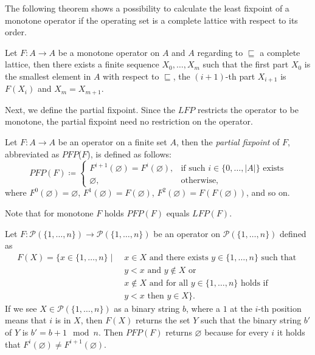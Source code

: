 The following theorem shows a possibility to calculate the least fixpoint of a monotone operator if the operating set is a complete lattice with respect to its order.

\begin{theorem}
\label{theorem:kleene}
Let $F: A \rightarrow A$ be a monotone operator on $A$ and $A$ regarding to $\sqsubseteq$ a complete lattice, then there exists a finite sequence $X_0, \dots, X_m$ such that the first part $X_0$ is the smallest element in $A$ with respect to $\sqsubseteq$, the $(i+1)$-th part $X_{i+1}$ is $F(X_i)$ and $X_m = X_{m+1}$.
\end{theorem}

Next, we define the partial fixpoint. Since the
$\mathit{LFP}$ restricts the operator to be monotone, the partial fixpoint need no restriction on the operator.

\begin{definition}
\label{definition:pfp}
    Let $F\colon A \rightarrow A$ be an operator on a finite set $A$, then the \emph{partial
    fixpoint} of $F$, abbreviated as $\mathit{PFP}$($F$), is defined as follows:
    \[\mathit{PFP}(F)\coloneqq\begin{cases}
               F^{i+1}(\varnothing)=F^i(\varnothing),  & \text{if such } i \in \{0,\dots,|A|\} \text{ exists}\\
               \varnothing, & \text{otherwise,}
    \end{cases}\]
    where $F^0(\varnothing) = \varnothing$, $F^1(\varnothing) = F(\varnothing)$, $F^2(\varnothing) = F(F(\varnothing))$, and so on.
\end{definition}

Note that for monotone $F$ holds $\mathit{PFP}(F)$ equals $\mathit{LFP}(F)$. 


\begin{example}
\label{example:pfp}
Let $F: \mathcal{P}(\{1, \dots, n\}) \rightarrow  \mathcal{P}(\{1, \dots, n\})$ be an operator on $ \mathcal{P}(\{1, \dots, n\})$ defined as
\begin{align*}
	F(X) = \{x \in \{1, \dots, n\}\mid &\; x\in X \text{ and there exists } y \in \{1, \dots, n\} \text{ such that }\\ &\;y < x \text{ and } y\not\in X \text{ or } \\&\;x\not\in X \text{ and for all } y\in \{1,\dots, n\} \text{ holds if } \\&\;y<x \text{ then } y\in X\}. 
\end{align*}
If we see $X \in \mathcal{P}(\{1,\dots, n\})$ as a binary string $b$, where a $1$ at the $i$-th position means that $i$ is in $X$, then $F(X)$ returns the set $Y$ such that the binary string $b'$ of $Y$ is $b' = b+1\mod n$. Then $PFP(F)$ returns $\varnothing$ because for every $i$ it holds that $F^i(\varnothing) \neq F^{i+1}(\varnothing)$.
\end{example}